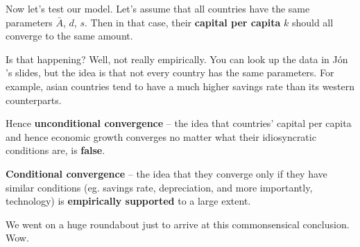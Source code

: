 \documentclass[11pt]{scrartcl}
\newcommand{\jon}{J\'{o}n }
\begin{document}
Now let's test our model. Let's assume that all countries have the same parameters $\bar{A}$, $d$, $s$. Then in that case, their \textbf{capital per capita} $k$ should all converge to the same amount. 

Is that happening? Well, not really empirically. You can look up the data in \jon's slides, but the idea is that not every country has the same parameters. For example, asian countries tend to have a much higher savings rate than its western counterparts.

Hence \textbf{unconditional convergence} -- the idea that countries' capital per capita and hence economic growth converges no matter what their idiosyncratic conditions are, is \textbf{false}.

\textbf{Conditional convergence} -- the idea that they converge only if they have similar conditions (eg. savings rate, depreciation, and more importantly, technology) is \textbf{empirically supported} to a large extent.

We went on a huge roundabout just to arrive at this commonsensical conclusion. Wow.
\end{document}
